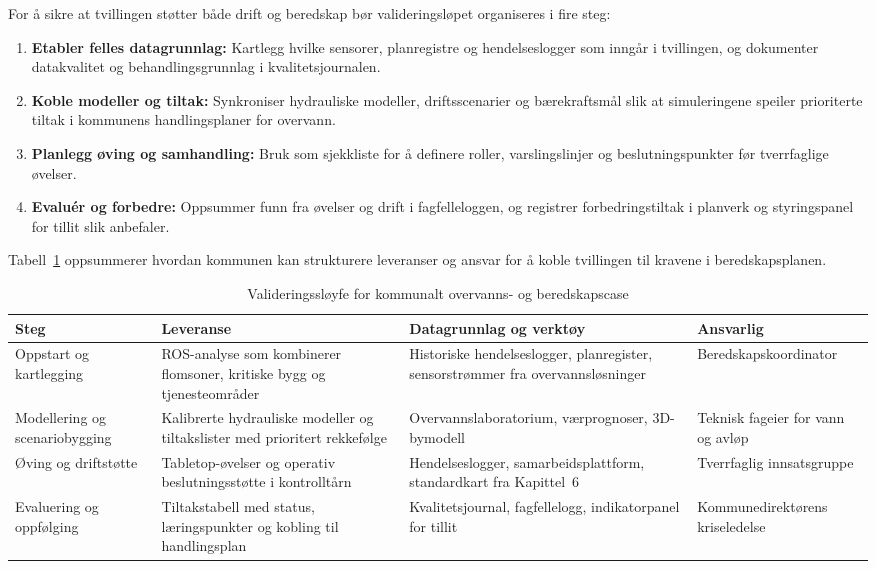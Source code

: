 For å sikre at tvillingen støtter både drift og beredskap bør valideringsløpet organiseres i fire steg:
\begin{enumerate}
    \item \textbf{Etabler felles datagrunnlag:} Kartlegg hvilke sensorer, planregistre og hendelseslogger som inngår i tvillingen, og dokumenter datakvalitet og behandlingsgrunnlag i kvalitetsjournalen.
    \item \textbf{Koble modeller og tiltak:} Synkroniser hydrauliske modeller, driftsscenarier og bærekraftsmål slik at simuleringene speiler prioriterte tiltak i kommunens handlingsplaner for overvann.\citep{oslo2023overvann}
    \item \textbf{Planlegg øving og samhandling:} Bruk \citet{dsb2022beredskap} som sjekkliste for å definere roller, varslingslinjer og beslutningspunkter før tverrfaglige øvelser.
    \item \textbf{Evaluér og forbedre:} Oppsummer funn fra øvelser og drift i fagfelleloggen, og registrer forbedringstiltak i planverk og styringspanel for tillit slik \citet{nve2022kommunal} anbefaler.
\end{enumerate}

Tabell~\ref{tab:kommunal-validering} oppsummerer hvordan kommunen kan strukturere leveranser og ansvar for å koble tvillingen til kravene i beredskapsplanen.

\begin{table}[ht]
    \centering
    \caption{Valideringssløyfe for kommunalt overvanns- og beredskapscase}
    \label{tab:kommunal-validering}
    \begin{tabular}{|p{3.2cm}|p{4.6cm}|p{4.6cm}|p{3.0cm}|}
        \hline
        \textbf{Steg} & \textbf{Leveranse} & \textbf{Datagrunnlag og verktøy} & \textbf{Ansvarlig} \\
        \hline
        Oppstart og kartlegging & ROS-analyse som kombinerer flomsoner, kritiske bygg og tjenesteområder & Historiske hendelseslogger, planregister, sensorstrømmer fra overvannsløsninger & Beredskapskoordinator \\
        \hline
        Modellering og scenariobygging & Kalibrerte hydrauliske modeller og tiltakslister med prioritert rekkefølge & Overvannslaboratorium, værprognoser, 3D-bymodell \citep{asplan2023overvannslab} & Teknisk fageier for vann og avløp \\
        \hline
        Øving og driftstøtte & Tabletop-øvelser og operativ beslutningsstøtte i kontrolltårn & Hendelseslogger, samarbeidsplattform, standardkart fra Kapittel~6 & Tverrfaglig innsatsgruppe \\
        \hline
        Evaluering og oppfølging & Tiltakstabell med status, læringspunkter og kobling til handlingsplan & Kvalitetsjournal, fagfellelogg, indikatorpanel for tillit & Kommunedirektørens kriseledelse \\
        \hline
    \end{tabular}
\end{table}

